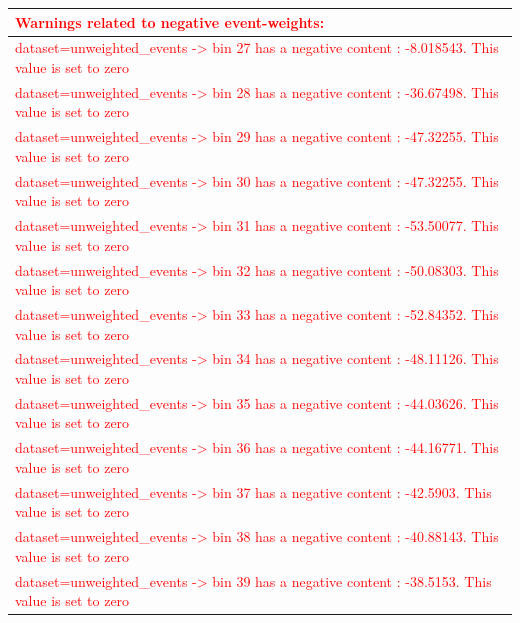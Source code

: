 \documentclass[a4paper, 10pt]{article}
\begin{document}
\begin{table}[H]
  \begin{center}
    \begin{tabular}{|m{140.0mm}|}
      \hline
      {\cellcolor{white}\textcolor{red}{Warnings related to negative event-weights:}}\\
      \hline
      {\cellcolor{white}\textcolor{red}{dataset=unweighted\_events -> bin 27 has a negative content : -8.018543. This value is set to zero}}\\
      \hline
      {\cellcolor{white}\textcolor{red}{dataset=unweighted\_events -> bin 28 has a negative content : -36.67498. This value is set to zero}}\\
      \hline
      {\cellcolor{white}\textcolor{red}{dataset=unweighted\_events -> bin 29 has a negative content : -47.32255. This value is set to zero}}\\
      \hline
      {\cellcolor{white}\textcolor{red}{dataset=unweighted\_events -> bin 30 has a negative content : -47.32255. This value is set to zero}}\\
      \hline
      {\cellcolor{white}\textcolor{red}{dataset=unweighted\_events -> bin 31 has a negative content : -53.50077. This value is set to zero}}\\
      \hline
      {\cellcolor{white}\textcolor{red}{dataset=unweighted\_events -> bin 32 has a negative content : -50.08303. This value is set to zero}}\\
      \hline
      {\cellcolor{white}\textcolor{red}{dataset=unweighted\_events -> bin 33 has a negative content : -52.84352. This value is set to zero}}\\
      \hline
      {\cellcolor{white}\textcolor{red}{dataset=unweighted\_events -> bin 34 has a negative content : -48.11126. This value is set to zero}}\\
      \hline
      {\cellcolor{white}\textcolor{red}{dataset=unweighted\_events -> bin 35 has a negative content : -44.03626. This value is set to zero}}\\
      \hline
      {\cellcolor{white}\textcolor{red}{dataset=unweighted\_events -> bin 36 has a negative content : -44.16771. This value is set to zero}}\\
      \hline
      {\cellcolor{white}\textcolor{red}{dataset=unweighted\_events -> bin 37 has a negative content : -42.5903. This value is set to zero}}\\
      \hline
      {\cellcolor{white}\textcolor{red}{dataset=unweighted\_events -> bin 38 has a negative content : -40.88143. This value is set to zero}}\\
      \hline
      {\cellcolor{white}\textcolor{red}{dataset=unweighted\_events -> bin 39 has a negative content : -38.5153. This value is set to zero}}\\
      \hline
\hline
    \end{tabular}
  \end{center}
\end{table}
\end{document}
